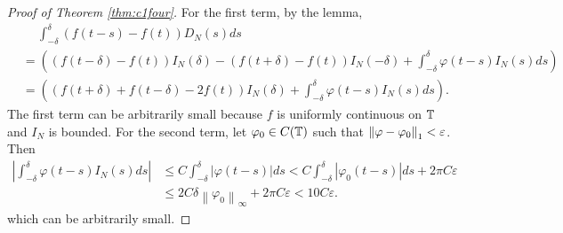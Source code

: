 \begin{enumerate}[label=\arabic*.]
\begin{proof}[Proof of Theorem \ref{thm:c1four}]
		\noindent For the first term, by the lemma,
		\begin{equation*}
			\begin{aligned}
				&~\quad\int_{-\delta}^\delta(f(t-s)-f(t)) D_N(s) d s \\
				& =\left((f(t-\delta)-f(t)) I_N(\delta)-(f(t+\delta)-f(t)) I_N(-\delta)+\int_{-\delta}^\delta \varphi(t-s) I_N(s) d s\right) \\
				& =\left((f(t+\delta)+f(t-\delta)-2 f(t)) I_N(\delta)+\int_{-\delta}^\delta \varphi(t-s) I_N(s) d s\right) .
			\end{aligned}
		\end{equation*}
		The first term can be arbitrarily small because $f$ is uniformly continuous on $\mathbb{T}$ and $I_N$ is bounded. For the second term, let $\varphi_0 \in C(\mathbb{T})$ such that $\left\lVert\varphi - \varphi_0\right\lVert_1 < \varepsilon$. Then
		\begin{equation*}
			\begin{aligned}
				\left|\int_{-\delta}^\delta \varphi(t-s) I_N(s) d s\right| & \leq C \int_{-\delta}^\delta|\varphi(t-s)| d s<C \int_{-\delta}^\delta\left|\varphi_0(t-s)\right| d s+2 \pi C \varepsilon \\
				& \leq 2 C \delta\left\|\varphi_0\right\|_{\infty}+2 \pi C \varepsilon<10 C \varepsilon .
			\end{aligned}
		\end{equation*}
		which can be arbitrarily small.
	\end{proof}


\end{enumerate}
